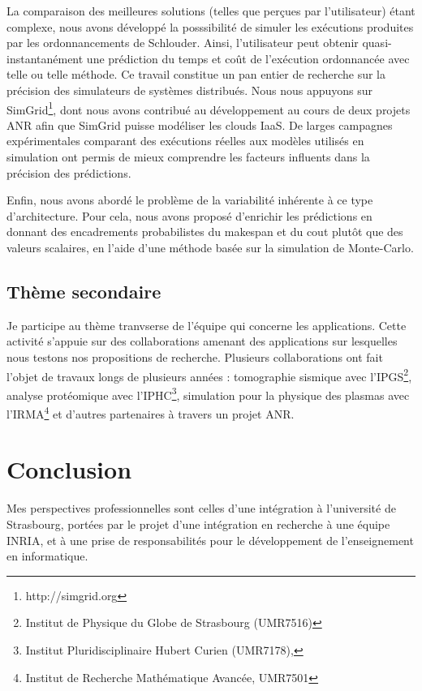 La comparaison des  meilleures solutions (telles que  perçues par l'utilisateur)
étant complexe, nous  avons développé la posssibilité de  simuler les exécutions
produites  par  les ordonnancements  de  Schlouder.   Ainsi, l'utilisateur  peut
obtenir  quasi-instantanément une  prédiction du  temps et  coût de  l'exécution
ordonnancée avec telle  ou telle méthode. Ce travail constitue  un pan entier de
recherche sur  la précision des  simulateurs de systèmes distribués.   Nous nous
appuyons sur SimGrid\footnote{http://simgrid.org}, dont  nous avons contribué au
développement au cours de deux projets ANR afin que SimGrid puisse modéliser les
clouds IaaS. De larges campagnes expérimentales comparant des exécutions réelles
aux modèles utilisés en simulation ont permis de mieux comprendre les facteurs
influents dans la précision des prédictions.

Enfin,  nous avons  abordé le  problème de  la variabilité  inhérente à  ce type
d'architecture.  Pour  cela, nous  avons proposé  d'enrichir les  prédictions en
donnant des  encadrements probabilistes du  makespan et  du cout plutôt  que des
valeurs  scalaires,  en  l'aide  d'une   méthode  basée  sur  la  simulation  de
Monte-Carlo.


\subsection{Thème secondaire}

Je  participe au  thème tranvserse  de l'équipe  qui concerne  les applications.
Cette  activité s'appuie  sur des  collaborations amenant  des applications  sur
lesquelles nous testons nos  propositions de recherche. Plusieurs collaborations
ont fait  l'objet de travaux  longs de  plusieurs années :  tomographie sismique
avec  l'IPGS\footnote{Institut de  Physique du  Globe de  Strasbourg (UMR7516)},
analyse  protéomique  avec  l'IPHC\footnote{Institut  Pluridisciplinaire  Hubert
  Curien   (UMR7178),},   simulation  pour   la   physique   des  plasmas   avec
l'IRMA\footnote{Institut de Recherche Mathématique Avancée, UMR7501} et d'autres
partenaires à travers un projet ANR.



\section{Conclusion}

Mes perspectives professionnelles sont celles d'une intégration à l'université
de Strasbourg, portées par le projet d'une intégration en recherche à une équipe
INRIA, et à une prise de responsabilités pour le développement de l'enseignement
en informatique.\\

